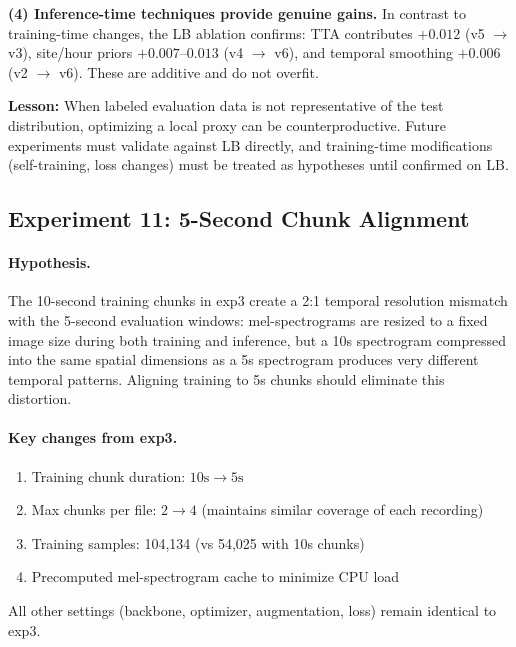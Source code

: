 \textbf{(4) Inference-time techniques provide genuine gains.}
In contrast to training-time changes, the LB ablation confirms:
TTA contributes $+0.012$ (v5 $\to$ v3), site/hour priors $+0.007$--$0.013$
(v4 $\to$ v6), and temporal smoothing $+0.006$ (v2 $\to$ v6).
These are additive and do not overfit.

\textbf{Lesson:} When labeled evaluation data is not representative of the
test distribution, optimizing a local proxy can be counterproductive.
Future experiments must validate against LB directly, and training-time
modifications (self-training, loss changes) must be treated as hypotheses
until confirmed on LB.

\subsection{Experiment 11: 5-Second Chunk Alignment}
\label{sec:exp11}

\paragraph{Hypothesis.}
The 10-second training chunks in exp3 create a 2:1 temporal resolution mismatch
with the 5-second evaluation windows: mel-spectrograms are resized to a fixed
image size during both training and inference, but a 10s spectrogram compressed
into the same spatial dimensions as a 5s spectrogram produces very different
temporal patterns. Aligning training to 5s chunks should eliminate this distortion.

\paragraph{Key changes from exp3.}
\begin{enumerate}
    \item Training chunk duration: $10\text{s} \to 5\text{s}$
    \item Max chunks per file: $2 \to 4$ (maintains similar coverage of each recording)
    \item Training samples: 104,134 (vs 54,025 with 10s chunks)
    \item Precomputed mel-spectrogram cache to minimize CPU load
\end{enumerate}
All other settings (backbone, optimizer, augmentation, loss) remain identical to exp3.

